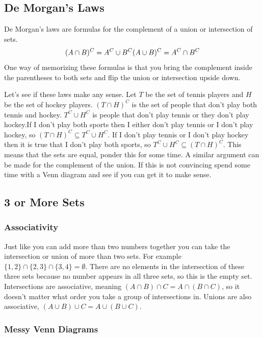 \documentclass[]{book}
\begin{document}
\subsection{De Morgan's Laws}\label{de-morgans-laws}

De Morgan's laws are formulas for the complement of a union or
intersection of sets. \[(A \cap B)^C = A^C \cup B^C \\
 (A \cup B)^C = A^C \cap B^C\] One way of memorizing these formulas is
that you bring the complement inside the parentheses to both sets and
flip the union or intersection upside down.

Let's see if these laws make any sense. Let \(T\) be the set of tennis
players and \(H\) be the set of hockey players. \((T \cap H)^C\) is the
set of people that don't play both tennis and hockey. \(T^C \cup H^C\)
is people that don't play tennis or they don't play hockey.If I don't
play both sports then I either don't play tennis or I don't play hockey,
so \((T \cap H)^C \subseteq T^C \cup H^C\). If I don't play tennis or I
don't play hockey then it is true that I don't play both sports, so
\(T^C \cup H^C \subseteq (T \cap H)^C\). This means that the sets are
equal, ponder this for some time. A similar argument can be made for the
complement of the union. If this is not convincing spend some time with
a Venn diagram and see if you can get it to make sense.

\subsection{3 or More Sets}\label{or-more-sets}

\subsubsection{Associativity}\label{associativity}

Just like you can add more than two numbers together you can take the
intersection or union of more than two sets. For example
\(\{1,2\} \cap \{2,3\} \cap \{3,4\} = \emptyset\). There are no elements
in the intersection of these three sets because no number appears in all
three sets, so this is the empty set. Intersections are associative,
meaning \((A \cap B) \cap C= A \cap (B \cap C)\), so it doesn't matter
what order you take a group of intersections in. Unions are also
associative, \((A \cup B) \cup C= A \cup (B \cup C)\).

\subsubsection{Messy Venn Diagrams}\label{messy-venn-diagrams}
\end{document}
